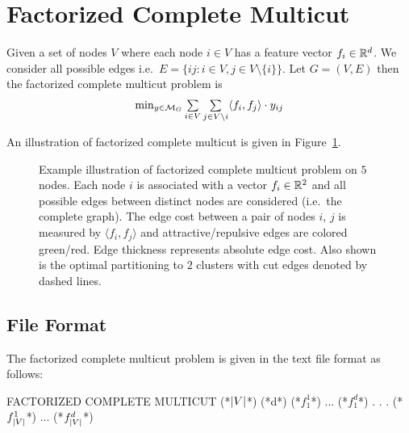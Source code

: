 \section{Factorized Complete Multicut}
\label{sec:complete_multicut}

\begin{definition}
    Given a set of nodes $V$ where each node $i \in V$ has a feature vector $f_i \in \mathbb{R}^d$. We consider all possible edges i.e.\ $E = \{ij : i \in V, j \in V\setminus \{i\} \}$. 
    Let $G = (V, E)$ then the factorized complete multicut problem is
    \begin{equation}
        \label{eq:factorized_complete_multicut}
        \begin{array}{rl}
            \min_{y \in \mathcal{M}_G} \sum\limits_{i \in V} \sum\limits_{j \in V \setminus i} \langle f_i, f_j \rangle \cdot y_{ij}
        \end{array}
    \end{equation}
\end{definition}

An illustration of factorized complete multicut is given in Figure~\ref{fig:factorized-complete-multicut}.

\begin{figure}[H]
    \begin{center}
    \scalebox{1.5}{}
    \end{center}
    \caption{Example illustration of factorized complete multicut problem on $5$ nodes. Each node $i$ is associated with a vector $f_i \in \mathbb{R}^2$ and all possible edges between distinct nodes are considered (i.e.\ the complete graph). The edge cost between a pair of nodes $i$, $j$ is measured by $\langle f_i, f_j \rangle$ and attractive/repulsive edges are colored green/red. Edge thickness represents absolute edge cost. Also shown is the optimal partitioning to $2$ clusters with cut edges denoted by dashed lines.}    
    \label{fig:factorized-complete-multicut}
\end{figure}

\subsection{File Format}
The factorized complete multicut problem is given in the text file format as follows:

\begin{fileformat}
FACTORIZED COMPLETE MULTICUT
(*$\lvert V\rvert$*) (*d*)
(*$f_1^1$*) ... (*$f_1^d$*)
.
.
.
(*$f_{\lvert V\rvert}^1$*) ... (*$f_{\lvert V\rvert}^d$*)
\end{fileformat}
